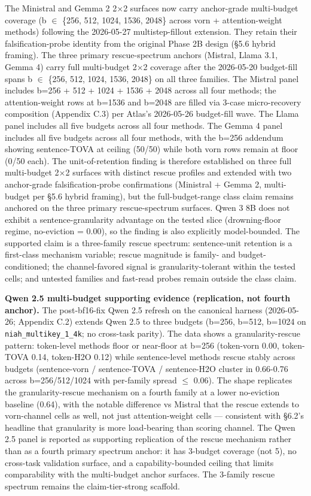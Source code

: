 \documentclass[
]{article}
\begin{document}
The Ministral and Gemma 2 2×2 surfaces now carry anchor-grade
multi-budget coverage (b $\in$ \{256, 512, 1024, 1536, 2048\} across vorn
+ attention-weight methods) following the 2026-05-27 multistep-fillout
extension. They retain their falsification-probe identity from the
original Phase 2B design (§5.6 hybrid framing). The three primary
rescue-spectrum anchors (Mistral, Llama 3.1, Gemma 4) carry full
multi-budget 2×2 coverage after the 2026-05-20 budget-fill spans b $\in$
\{256, 512, 1024, 1536, 2048\} on all three families. The Mistral panel includes b=256 +
512 + 1024 + 1536 + 2048 across all four methods; the attention-weight
rows at b=1536 and b=2048 are filled via 3-case micro-recovery
composition (Appendix C.3) per Atlas's 2026-05-26 budget-fill wave.
The Llama panel includes all five budgets across all four methods. The
Gemma 4 panel includes all five budgets across all four methods, with
the b=256 addendum showing sentence-TOVA at ceiling (50/50) while both
vorn rows remain at floor (0/50 each). The unit-of-retention finding is
therefore established on three full multi-budget 2×2 surfaces with
distinct rescue profiles and extended with two anchor-grade
falsification-probe confirmations (Ministral + Gemma 2, multi-budget
per §5.6 hybrid framing), but the full-budget-range class claim
remains anchored on the three primary rescue-spectrum surfaces. Qwen 3
8B does not exhibit a sentence-granularity advantage on the tested slice
(drowning-floor regime, no-eviction = 0.00), so the finding is also
explicitly model-bounded. The supported claim is a three-family rescue
spectrum: sentence-unit retention is a first-class mechanism variable;
rescue magnitude is family- and budget-conditioned; the channel-favored
signal is granularity-tolerant within the tested cells; and untested
families and fast-read probes remain outside the class claim.

\textbf{Qwen 2.5 multi-budget supporting evidence (replication, not
fourth anchor).} The post-bf16-fix Qwen 2.5 refresh on the canonical
harness (2026-05-26; Appendix C.2) extends Qwen 2.5 to three budgets
(b=256, b=512, b=1024 on \texttt{niah\_multikey\_1\_4k}; no cross-task
parity). The data shows a granularity-rescue pattern: token-level
methods floor or near-floor at b=256 (token-vorn 0.00, token-TOVA 0.14,
token-H2O 0.12) while sentence-level methods rescue stably across
budgets (sentence-vorn / sentence-TOVA / sentence-H2O cluster in
0.66-0.76 across b=256/512/1024 with per-family spread $\le$ 0.06). The
shape replicates the granularity-rescue mechanism on a fourth family at
a lower no-eviction baseline (0.64), with the notable difference vs
Mistral that the rescue extends to vorn-channel cells as well, not just
attention-weight cells --- consistent with §6.2's headline that
granularity is more load-bearing than scoring channel. The Qwen 2.5
panel is reported as supporting replication of the rescue mechanism
rather than as a fourth primary spectrum anchor: it has 3-budget
coverage (not 5), no cross-task validation surface, and a
capability-bounded ceiling that limits comparability with the
multi-budget anchor surfaces. The 3-family rescue spectrum remains the
claim-tier-strong scaffold.
\end{document}
